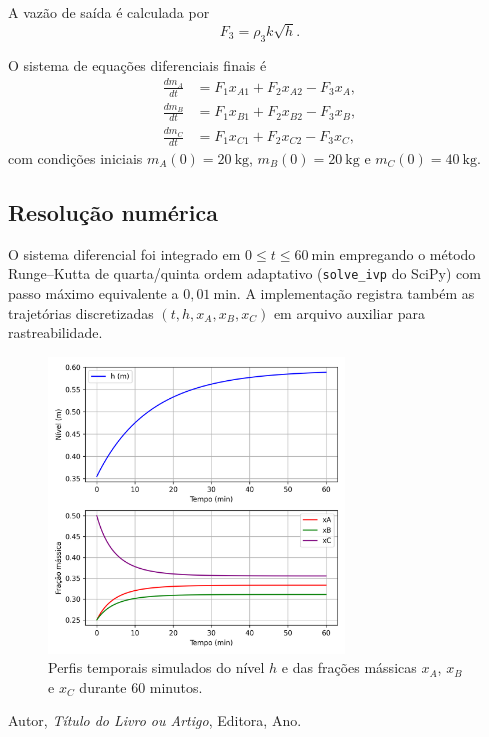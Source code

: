 \documentclass{article}
\begin{document}
A vazão de saída é calculada por
\begin{equation}
  F_3 = \rho_3 k \sqrt{h}. \label{eq:F3-q2}
\end{equation}

O sistema de equações diferenciais finais é
\begin{align}
  \frac{dm_A}{dt} &= F_1 x_{A1} + F_2 x_{A2} - F_3 x_A, \label{eq:balanco-A} \\
  \frac{dm_B}{dt} &= F_1 x_{B1} + F_2 x_{B2} - F_3 x_B, \label{eq:balanco-B} \\
  \frac{dm_C}{dt} &= F_1 x_{C1} + F_2 x_{C2} - F_3 x_C, \label{eq:balanco-C}
\end{align}
com condições iniciais $m_A(0) = 20\ \mathrm{kg}$, $m_B(0) = 20\ \mathrm{kg}$ e $m_C(0) = 40\ \mathrm{kg}$.

\subsection*{Resolução numérica}
O sistema diferencial foi integrado em $0 \leq t \leq 60\ \mathrm{min}$ empregando o método Runge--Kutta de quarta/quinta ordem adaptativo (\texttt{solve\_ivp} do SciPy) com passo máximo equivalente a $0{,}01\ \mathrm{min}$. A implementação registra também as trajetórias discretizadas $(t, h, x_A, x_B, x_C)$ em arquivo auxiliar para rastreabilidade.



\begin{figure}[h!]
  \centering
  \includegraphics[width=0.7\textwidth]{figuras/questao2_tanque.png}
  \caption{Perfis temporais simulados do nível $h$ e das frações mássicas $x_A$, $x_B$ e $x_C$ durante 60 minutos.}
  \label{fig:questao2}
\end{figure}%

\begin{thebibliography}{9}
  Autor, \emph{Título do Livro ou Artigo}, Editora, Ano.
\end{thebibliography}
\end{document}
